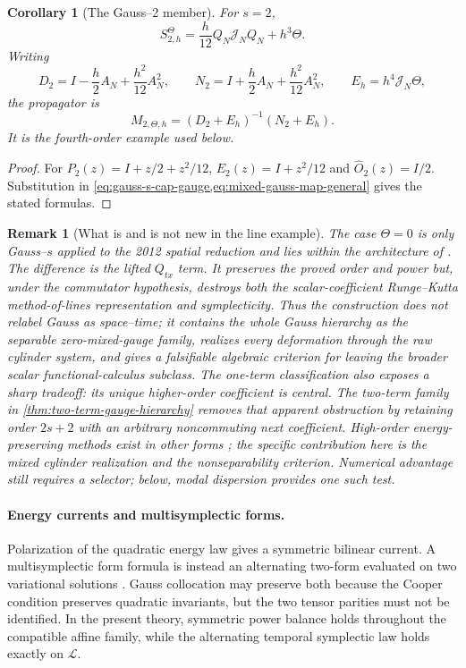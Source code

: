 \documentclass[11pt,a4paper]{article}
\newtheorem{corollary}[theorem]{Corollary}
\newtheorem{remark}[theorem]{Remark}
\begin{document}
\begin{corollary}[The Gauss--2 member]
\label{cor:mixed-gauss-two}
For \(s=2\),
\begin{equation}\label{eq:mixed-gauss-two-gauge}
 S_{2,h}^{\Theta}
 =\frac h{12}Q_N\mathcal J_NQ_N+h^3\Theta.
\end{equation}
Writing
\[
 D_2=I-\frac h2A_N+\frac{h^2}{12}A_N^2,
 \qquad
 N_2=I+\frac h2A_N+\frac{h^2}{12}A_N^2,
 \qquad E_h=h^4\mathcal J_N\Theta,
\]
the propagator is
\begin{equation}\label{eq:mixed-gauss-map}
 M_{2,\Theta,h}=(D_2+E_h)^{-1}(N_2+E_h).
\end{equation}
It is the fourth-order example used below.
\end{corollary}

\begin{proof}
For \(P_2(z)=I+z/2+z^2/12\),
\(E_2(z)=I+z^2/12\) and \(\widehat O_2(z)=I/2\).  Substitution in
\cref{eq:gauss-s-cap-gauge,eq:mixed-gauss-map-general} gives the stated
formulas.
\end{proof}

\begin{remark}[What is and is not new in the line example]
The case \(\Theta=0\) is only Gauss--\(s\) applied to the 2012 spatial
reduction and lies within the architecture of \cite{kotyczka2019}.
The difference is the lifted \(Q_{tx}\) term.  It preserves the proved
order and power but, under the commutator hypothesis, destroys both the
scalar-coefficient Runge--Kutta method-of-lines representation and
symplecticity.  Thus the construction does not relabel Gauss as
space--time; it contains the whole Gauss hierarchy as the separable
zero-mixed-gauge family, realizes every deformation through the raw
cylinder system, and gives a falsifiable algebraic criterion for leaving
the broader scalar functional-calculus subclass.  The one-term
classification also exposes a sharp tradeoff: its unique higher-order
coefficient is central.  The two-term family in
\cref{thm:two-term-gauge-hierarchy} removes that apparent obstruction by
retaining order \(2s+2\) with an arbitrary noncommuting next coefficient.
High-order
energy-preserving methods exist in other forms
\cite{miyatake2016,eidnes2022,kemmochi2023}; the specific contribution
here is the mixed cylinder realization and the nonseparability criterion.
Numerical advantage still requires a selector; below, modal dispersion
provides one such test.
\end{remark}

\paragraph{Energy currents and multisymplectic forms.}
Polarization of the quadratic energy law gives a symmetric bilinear
current.  A multisymplectic form formula is instead an alternating
two-form evaluated on two variational solutions
\cite{bridges2001,reich2000}.  Gauss collocation may preserve both because
the Cooper condition preserves quadratic invariants, but the two tensor
parities must not be identified.  In the present theory, symmetric power
balance holds throughout the compatible affine family, while the
alternating temporal symplectic law holds exactly on \(\mathcal L\).
\end{document}
